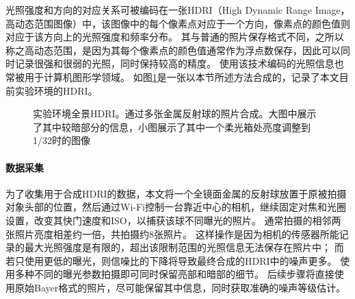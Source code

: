 光照强度和方向的对应关系可被编码在一张HDRI（High Dynamic Range Image，高动态范围图像）中，该图像中的每个像素点对应于一个方向，像素点的颜色值则对应于该方向上的光照强度和频率分布。
其与普通的照片保存格式不同，之所以称之高动态范围，是因为其每个像素点的颜色值通常作为浮点数保存，因此可以同时记录很强和很弱的光照，同时保持较高的精度。
使用该技术编码的光照信息也常被用于计算机图形学领域。
如图\ref{fig:HDRI}是一张以本节所述方法合成的，记录了本文目前实验环境的HDRI。
\begin{figure}
\caption[实验环境全景HDRI]{实验环境全景HDRI。通过多张金属反射球的照片合成。大图中展示了其中较暗部分的信息，小图展示了其中一个柔光箱处亮度调整到1/32时的图像}
\label{fig:HDRI}
\end{figure}

\paragraph{数据采集}
为了收集用于合成HDRI的数据，本文将一个全镜面金属的反射球放置于原被拍摄对象头部的位置，然后通过Wi-Fi控制一台靠近中心的相机，继续固定对焦和光圈设置，改变其快门速度和ISO，以捕获该球不同曝光的照片。
通常拍摄的相邻两张照片亮度相差约一倍，共拍摄约8张照片。
这样操作是因为相机的传感器所能记录的最大光照强度是有限的，超出该限制范围的光照信息无法保存在照片中；
而若只使用更低的曝光，则信噪比的下降将导致最终合成的HDRI中的噪声更多。
使用多种不同的曝光参数拍摄即可同时保留亮部和暗部的细节。
后续步骤将直接使用原始Bayer格式的照片，尽可能保留其中信息，同时获取准确的噪声等级估计。

